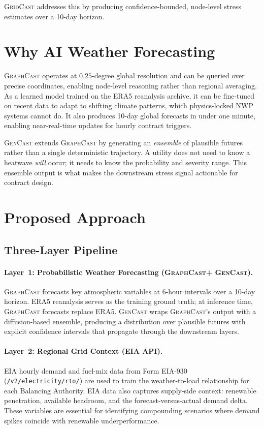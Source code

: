 \documentclass[10pt,letterpaper]{article}
\newcommand{\gridcast}{\textsc{GridCast}\xspace}
\newcommand{\graphcast}{\textsc{GraphCast}\xspace}
\newcommand{\gencast}{\textsc{GenCast}\xspace}
\begin{document}
\gridcast addresses this by producing confidence-bounded, node-level stress estimates over
a 10-day horizon.

\section{Why AI Weather Forecasting}

\graphcast operates at $0.25$-degree global resolution and can be queried over precise
coordinates, enabling node-level reasoning rather than regional averaging. As a learned model
trained on the ERA5 reanalysis archive, it can be fine-tuned on recent data to adapt to
shifting climate patterns, which physics-locked NWP systems cannot do. It also produces
10-day global forecasts in under one minute, enabling near-real-time updates for hourly
contract triggers.

\gencast extends \graphcast by generating an \emph{ensemble} of plausible futures rather
than a single deterministic trajectory. A utility does not need to know a heatwave \emph{will}
occur; it needs to know the probability and severity range. This ensemble output is what makes
the downstream stress signal actionable for contract design.

\section{Proposed Approach}

\subsection{Three-Layer Pipeline}

\paragraph{Layer~1: Probabilistic Weather Forecasting (\graphcast + \gencast).}
\graphcast forecasts key atmospheric variables at 6-hour intervals over a 10-day horizon.
ERA5 reanalysis serves as the training ground truth; at inference time, \graphcast forecasts
replace ERA5. \gencast wraps \graphcast's output with a diffusion-based ensemble,
producing a distribution over plausible futures with explicit confidence intervals that
propagate through the downstream layers.

\paragraph{Layer~2: Regional Grid Context (EIA API).}
EIA hourly demand and fuel-mix data from Form EIA-930 (\texttt{/v2/electricity/rto/}) are
used to train the weather-to-load relationship for each Balancing Authority. EIA data also
captures supply-side context: renewable penetration, available headroom, and the
forecast-versus-actual demand delta. These variables are essential for identifying compounding
scenarios where demand spikes coincide with renewable underperformance.
\end{document}
